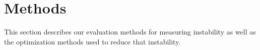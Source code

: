 \documentclass[10pt,conference]{IEEEtran}
\makeatletter
\newcommand{\mybox}[1]{%
  \setbox0=\hbox{#1}%
  \setlength{\@tempdima}{\dimexpr\linewidth}%
  \begin{tcolorbox}[colframe=mycolor,boxrule=0.5pt,arc=4pt,
      left=6pt,right=6pt,top=6pt,bottom=6pt,boxsep=0pt,width=\@tempdima]
    #1
  \end{tcolorbox}
}
\theoremstyle{break}
\makeatother
\begin{document}





\section{Methods}
\label{sect:evaluation}
This section describes our evaluation methods for measuring instability as well as the optimization
methods used to reduce that instability.
\end{document}
